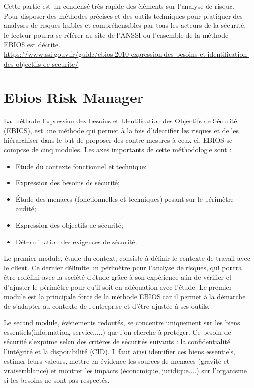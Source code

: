 \begin{nota}
Cette partie est un condensé très rapide des éléments sur l'analyse de risque. Pour disposer des méthodes précises et des outils techniques pour pratiquer des analyses de risques lisibles et compréhensibles par tous les acteurs de la sécurité, le lecteur pourra se référer au site de l’ANSSI ou l’ensemble de la méthode EBIOS est décrite.\\
\tiny \url{https://www.ssi.gouv.fr/guide/ebios-2010-expression-des-besoins-et-identification-des-objectifs-de-securite/}
\end{nota}

\section{Ebios Risk Manager}
La méthode Expression des Besoins et Identification des Objectifs de Sécurité (EBIOS), est une méthode qui permet à la fois d’identifier les risques et de les hiérarchiser dans le but de proposer des contre-mesures à ceux ci. 
EBIOS se compose de cinq modules. Les axes importants de cette méthodologie sont :

\begin{itemize}
  \item Etude du contexte fonctionnel et technique;
  \item Expression des besoins de sécurité;
  \item Étude des menaces (fonctionnelles et techniques) pesant sur le périmètre audité;
  \item Expression des objectifs de sécurité;
  \item Détermination des exigences de sécurité.
\end{itemize}

Le premier module, étude du context, consiste à définir le contexte de travail avec le client. Ce dernier délimite un périmètre pour l’analyse de risques, qui pourra être redéfini avec la société d’étude grâce à son expérience afin de vérifier et d’ajuster le périmètre pour qu’il soit en adéquation avec l’étude. Le premier module est la principale force de la méthode EBIOS car il permet à la démarche de s’adapter au contexte de l’entreprise et d’être ajustée à ses outils.

Le second module, événements redoutés, se concentre uniquement sur les biens essentiels(information, service,....) que l’on cherche à protéger. Ce besoin de sécurité s’exprime selon des critères de sécurités suivants : la confidentialité, l’intégrité et la disponibilité (CID). Il faut ainsi identifier ces biens essentiels, estimer leurs valeurs, mettre en évidence les sources de menaces (gravité et vraisemblance) et montrer les impacts (économique, juridique....) sur l’organisme si les besoins ne sont pas respectés.

